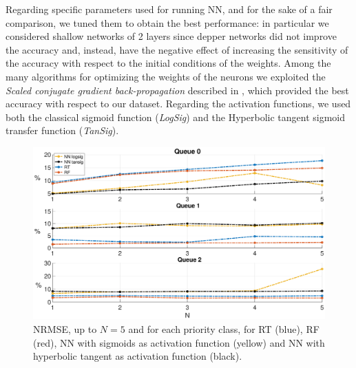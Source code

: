 Regarding specific parameters used for running NN, and for the sake of a fair comparison, we tuned them to obtain the best performance: in particular we considered shallow networks of 2 layers since depper networks did not improve the accuracy and, instead, have the negative effect of increasing the sensitivity of the accuracy with respect to the initial conditions of the weights. Among the many algorithms for optimizing the weights of the neurons we exploited the \textit{Scaled conjugate gradient back-propagation} described in \cite{Moller1990}, which provided the best accuracy with respect to our dataset. Regarding the activation functions, we used both the classical sigmoid function (\textit{LogSig}) and the Hyperbolic tangent sigmoid transfer function (\textit{TanSig}).
\begin{figure}[h!]
	\centering
	\includegraphics[trim={120 0 120 0},width=0.9\linewidth]{figure/NRMSENNvsRTvsRF.eps}
	\vspace{-0.2cm}
	\caption{NRMSE, up to $N=5$ and for each priority class, for RT (blue), RF (red), NN with sigmoids as activation function (yellow) and NN with hyperbolic tangent as activation function (black).}
	\label{fig:{NRMSE}}
\end{figure}

